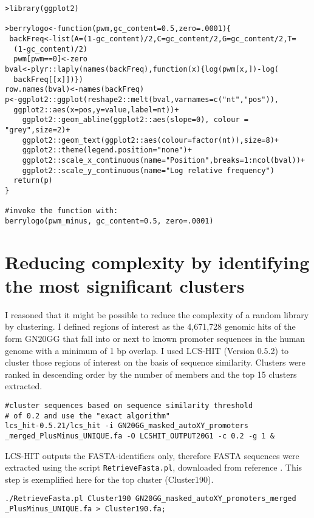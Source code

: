 \begin{lstlisting}
>library(ggplot2) 

>berrylogo<-function(pwm,gc_content=0.5,zero=.0001){
 backFreq<-list(A=(1-gc_content)/2,C=gc_content/2,G=gc_content/2,T=
  (1-gc_content)/2)
  pwm[pwm==0]<-zero
bval<-plyr::laply(names(backFreq),function(x){log(pwm[x,])-log(
  backFreq[[x]])})
row.names(bval)<-names(backFreq)
p<-ggplot2::ggplot(reshape2::melt(bval,varnames=c("nt","pos")),
  ggplot2::aes(x=pos,y=value,label=nt))+
    ggplot2::geom_abline(ggplot2::aes(slope=0), colour = "grey",size=2)+
    ggplot2::geom_text(ggplot2::aes(colour=factor(nt)),size=8)+
    ggplot2::theme(legend.position="none")+
    ggplot2::scale_x_continuous(name="Position",breaks=1:ncol(bval))+
    ggplot2::scale_y_continuous(name="Log relative frequency")
  return(p)
}

#invoke the function with:
berrylogo(pwm_minus, gc_content=0.5, zero=.0001)
\end{lstlisting}

\section{Reducing complexity by identifying the most significant clusters}

I reasoned that it might be possible to reduce the complexity of a random library by clustering. I defined regions of interest as the 4,671,728 genomic hits of the form GN20GG that fall into or next to known promoter sequences in the human genome with a minimum of 1 bp overlap. I used LCS-HIT (Version 0.5.2) \cite{Namiki:2013bv} to cluster those regions of interest on the basis of sequence similarity. Clusters were ranked in descending order by the number of members and the top 15 clusters extracted.

\begin{lstlisting}
#cluster sequences based on sequence similarity threshold
# of 0.2 and use the "exact algorithm"
lcs_hit-0.5.21/lcs_hit -i GN20GG_masked_autoXY_promoters
_merged_PlusMinus_UNIQUE.fa -O LCSHIT_OUTPUT20G1 -c 0.2 -g 1 & 
\end{lstlisting}

LCS-HIT outputs the FASTA-identifiers only, therefore FASTA sequences were extracted using the script  \verb|RetrieveFasta.pl|, downloaded from reference \cite{Retrieve:Online}. This step is exemplified here  for the top cluster (Cluster190).

\begin{lstlisting}
./RetrieveFasta.pl Cluster190 GN20GG_masked_autoXY_promoters_merged
_PlusMinus_UNIQUE.fa > Cluster190.fa;
\end{lstlisting}

